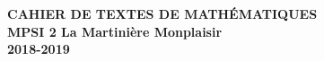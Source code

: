 \documentclass[12pt,a4paper]{article}
\begin{document}
\begin{center}
\Large\bf CAHIER DE TEXTES DE MATHÉMATIQUES\\
MPSI 2 La Martinière Monplaisir\\ 2018-2019
\end{center}
\vspace{1cm}
\vspace{.4cm}

% 
% 
% 
% 
% 
% 
% 
% 
% 

% 
%
\end{document}
